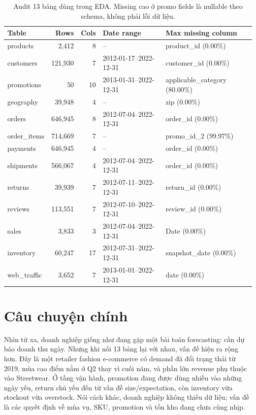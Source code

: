 \documentclass{article}
\begin{document}
\begin{table}[H]
\caption{Audit 13 bảng dùng trong EDA. Missing cao ở promo fields là nullable theo schema, không phải lỗi dữ liệu.}
\centering
\scriptsize
\begin{tabularx}{\linewidth}{lrrlX}
\toprule
Table & Rows & Cols & Date range & Max missing column \\
\midrule
products & 2,412 & 8 & -- & product\_id (0.00\%) \\
customers & 121,930 & 7 & 2012-01-17--2022-12-31 & customer\_id (0.00\%) \\
promotions & 50 & 10 & 2013-01-31--2022-12-31 & applicable\_category (80.00\%) \\
geography & 39,948 & 4 & -- & zip (0.00\%) \\
orders & 646,945 & 8 & 2012-07-04--2022-12-31 & order\_id (0.00\%) \\
order\_items & 714,669 & 7 & -- & promo\_id\_2 (99.97\%) \\
payments & 646,945 & 4 & -- & order\_id (0.00\%) \\
shipments & 566,067 & 4 & 2012-07-04--2022-12-31 & order\_id (0.00\%) \\
returns & 39,939 & 7 & 2012-07-11--2022-12-31 & return\_id (0.00\%) \\
reviews & 113,551 & 7 & 2012-07-10--2022-12-31 & review\_id (0.00\%) \\
sales & 3,833 & 3 & 2012-07-04--2022-12-31 & Date (0.00\%) \\
inventory & 60,247 & 17 & 2012-07-31--2022-12-31 & snapshot\_date (0.00\%) \\
web\_traffic & 3,652 & 7 & 2013-01-01--2022-12-31 & date (0.00\%) \\
\bottomrule
\end{tabularx}
\end{table}

\section{Câu chuyện chính}
Nhìn từ xa, doanh nghiệp giống như đang gặp một bài toán forecasting: cần dự báo doanh thu ngày. Nhưng khi nối 13 bảng lại với nhau, vấn đề hiện ra rộng hơn. Đây là một retailer fashion e-commerce có demand đã đổi trạng thái từ 2019, mùa cao điểm nằm ở Q2 thay vì cuối năm, và phần lớn revenue phụ thuộc vào Streetwear. Ở tầng vận hành, promotion đang được dùng nhiều vào những ngày yếu, return chủ yếu đến từ vấn đề size/expectation, còn inventory vừa stockout vừa overstock. Nói cách khác, doanh nghiệp không thiếu dữ liệu; vấn đề là các quyết định về mùa vụ, SKU, promotion và tồn kho đang chưa cùng nhịp.
\end{document}
